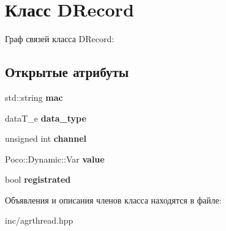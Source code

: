 \hypertarget{classDRecord}{}\section{Класс D\+Record}
\label{classDRecord}


Граф связей класса D\+Record\+:
\subsection*{Открытые атрибуты}
\begin{DoxyCompactItemize}
\item 
\mbox{\label{classDRecord_a151575d50dfb67af68787281d89adece}} 
std\+::string {\bfseries mac}
\item 
\mbox{\label{classDRecord_af2da692cf4812d1e3c8cc05f6a8eb5f1}} 
data\+T\+\_\+e {\bfseries data\+\_\+type}
\item 
\mbox{\label{classDRecord_a5bbe45ca72ff94d649831b50b8f3e47e}} 
unsigned int {\bfseries channel}
\item 
\mbox{\label{classDRecord_a15fd951c4facbfdcd6f7b063bbf31b28}} 
Poco\+::\+Dynamic\+::\+Var {\bfseries value}
\item 
\mbox{\label{classDRecord_a00d226a1f362f57bd8c2946ee189cb2a}} 
bool {\bfseries registrated}
\end{DoxyCompactItemize}


Объявления и описания членов класса находятся в файле\+:\begin{DoxyCompactItemize}
\item 
inc/agrthread.\+hpp\end{DoxyCompactItemize}
